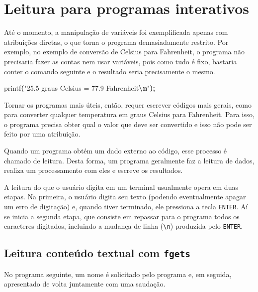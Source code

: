 \documentclass[
  11pt,
  a4paper,
]{scrbook}
\newenvironment{Shaded}{\begin{snugshade}}{\end{snugshade}}
\newcommand{\NormalTok}[1]{#1}
\newcommand{\OperatorTok}[1]{\textcolor[rgb]{0.81,0.36,0.00}{\textbf{#1}}}
\newcommand{\SpecialCharTok}[1]{\textcolor[rgb]{0.81,0.36,0.00}{\textbf{#1}}}
\newcommand{\StringTok}[1]{\textcolor[rgb]{0.31,0.60,0.02}{#1}}
\begin{document}
\section{Leitura para programas
interativos}\label{leitura-para-programas-interativos}

Até o momento, a manipulação de variáveis foi exemplificada apenas com
atribuições diretas, o que torna o programa demasiadamente restrito. Por
exemplo, no exemplo de conversão de Celsius para Fahrenheit, o programa
não precisaria fazer as contas nem usar variáveis, pois como tudo é
fixo, bastaria conter o comando seguinte e o resultado seria
precisamente o mesmo.

\begin{Shaded}
\begin{Highlighting}[]
\NormalTok{printf}\OperatorTok{(}\StringTok{"25.5 graus Celsius = 77.9 Fahrenheit}\SpecialCharTok{\textbackslash{}n}\StringTok{"}\OperatorTok{);}
\end{Highlighting}
\end{Shaded}

Tornar os programas mais úteis, então, requer escrever códigos mais
gerais, como para converter qualquer temperatura em graus Celsius para
Fahrenheit. Para isso, o programa precisa obter qual o valor que deve
ser convertido e isso não pode ser feito por uma atribuição.

Quando um programa obtém um dado externo ao código, esse processo é
chamado de leitura. Desta forma, um programa geralmente faz a leitura de
dados, realiza um processamento com eles e escreve os resultados.

A leitura do que o usuário digita em um terminal usualmente opera em
duas etapas. Na primeira, o usuário digita seu texto (podendo
eventualmente apagar um erro de digitação) e, quando tiver terminado,
ele pressiona a tecla \texttt{ENTER}. Aí se inicia a segunda etapa, que
consiste em repassar para o programa todos os caracteres digitados,
incluindo a mudança de linha (\texttt{\textbackslash{}n}) produzida pelo
\texttt{ENTER}.

\subsection{\texorpdfstring{Leitura conteúdo textual com
\texttt{fgets}}{Leitura conteúdo textual com fgets}}\label{sec-leitura-de-valores-textuais}

No programa seguinte, um nome é solicitado pelo programa e, em seguida,
apresentado de volta juntamente com uma saudação.
\end{document}
